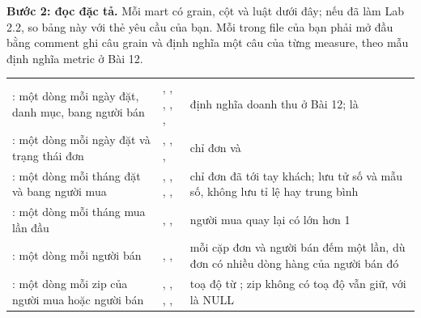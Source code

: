 \textbf{Bước 2: đọc đặc tả.} Mỗi mart có grain, cột và luật dưới đây; nếu đã làm Lab 2.2, so bảng này với thẻ yêu cầu của bạn. Mỗi  trong file của bạn phải mở đầu bằng comment ghi câu grain và định nghĩa một câu của từng measure, theo mẫu định nghĩa metric ở Bài 12.

\begin{xltabular}{\textwidth}{@{}P{3.8cm} P{4.2cm} L@{}}
\toprule
{} &  &  \\
\midrule
\endhead
\bottomrule
\endfoot
{}: một dòng mỗi ngày đặt, danh mục, bang người bán & , , , , ,  & định nghĩa doanh thu ở Bài 12;  là  \\
: một dòng mỗi ngày đặt và trạng thái đơn & , , ,  & chỉ đơn  và  \\
: một dòng mỗi tháng đặt và bang người mua & , , , ,  & chỉ đơn đã tới tay khách; lưu tử số và mẫu số, không lưu tỉ lệ hay trung bình \\
: một dòng mỗi tháng mua lần đầu & , ,  & người mua quay lại có  lớn hơn 1 \\
: một dòng mỗi người bán & , ,  & mỗi cặp đơn và người bán đếm một lần, dù đơn có nhiều dòng hàng của người bán đó \\
: một dòng mỗi zip của người mua hoặc người bán & , , , ,  & toạ độ từ ; zip không có toạ độ vẫn giữ, với  là NULL \\
\end{xltabular}

